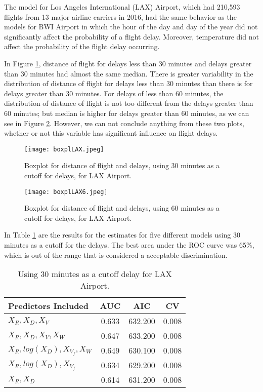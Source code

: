 \documentclass{asaproc}
\begin{document}
The model for Los Angeles International (LAX) Airport, which had 210,593 flights from 13 major airline carriers in 2016, had the same behavior as the models for BWI Airport in which the hour of the day and day of the year did not significantly affect the probability of a flight delay. Moreover, temperature did not affect the probability of the flight delay occurring.


In Figure \ref{boxplLAX}, distance of flight for delays less than 30 minutes and delays greater than 30 minutes had almost the same median. There is greater variability in the distribution of distance of flight for delays less than 30 minutes than there is for delays greater than 30 minutes. For delays of less than 60 minutes, the distribution of distance of flight is not too different from the delays greater than 60 minutes; but median is higher for delays greater than 60 minutes, as we can see in Figure \ref{boxplLAX6}. However, we can not conclude anything from these two plots, whether or not this variable has significant influence on flight delays.

\begin{figure}[h]
    \centering
    \texttt{[image: boxplLAX.jpeg]}
    \caption{Boxplot for distance of flight and delays, using 30 minutes as a cutoff for delays, for LAX Airport.}
    \label{boxplLAX}
\end{figure}

\begin{figure}[h]
    \centering
    \texttt{[image: boxplLAX6.jpeg]}
    \caption{Boxplot for distance of flight and delays, using 60 minutes as a cutoff for delays, for LAX Airport.}
    \label{boxplLAX6}
\end{figure}

In Table \ref{estimates30la} are the results for the estimates for five different models using 30 minutes as a cutoff for the delays. The best area under the ROC curve was 65\%, which is out of the range that is considered a acceptable discrimination.

\begin{table}[H]
\caption{Using 30 minutes as a cutoff delay for LAX Airport.}\label{estimates30la}
\centering
\begin{tabular}{|l||c|c|c|}
\hline
Predictors Included & AUC & AIC & CV\\
\hline
\hline
$X_R, X_D, X_V$ & 0.633 & 632.200 &  0.008\\
\hline
$X_R, X_D, X_{V}, X_W$ & 0.647 & 633.200 & 0.008 \\
\hline
$X_R, log(X_D), X_{V_f}, X_W$ & 0.649 & 630.100  & 0.008 \\
\hline
$X_R, log(X_D), X_{V_f}$ & 0.634 & 629.200 &  0.008 \\
\hline
$X_R, X_D$ & 0.614 & 631.200 &    0.008\\
\hline
\end{tabular}
\end{table}
\end{document}
